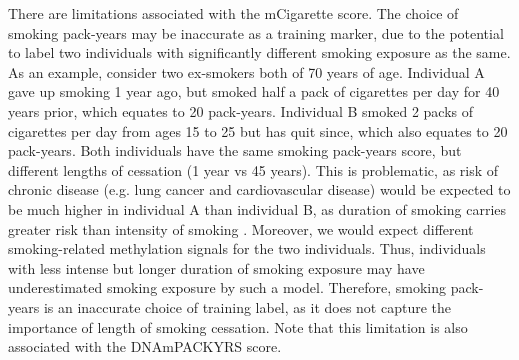 \documentclass{article}
\begin{document}

There are limitations associated with the mCigarette score. The choice of smoking pack-years may be inaccurate as a training marker, due to the potential to label two individuals with significantly different smoking exposure as the same. As an example, consider two ex-smokers both of 70 years of age. Individual A gave up smoking 1 year ago, but smoked half a pack of cigarettes per day for 40 years prior, which equates to 20 pack-years. Individual B smoked 2 packs of cigarettes per day from ages 15 to 25 but has quit since, which also equates to 20 pack-years. Both individuals have the same smoking pack-years score, but different lengths of cessation (1 year vs 45 years). This is problematic, as risk of chronic disease (e.g. lung cancer and cardiovascular disease) would be expected to be much higher in individual A than individual B, as duration of smoking carries greater risk than intensity of smoking \cite{potter2024pack}. Moreover, we would expect different smoking-related methylation signals for the two individuals. Thus, individuals with less intense but longer duration of smoking exposure may have underestimated smoking exposure by such a model. Therefore, smoking pack-years is an inaccurate choice of training label, as it does not capture the importance of length of smoking cessation. Note that this limitation is also associated with the DNAmPACKYRS score.

\end{document}
